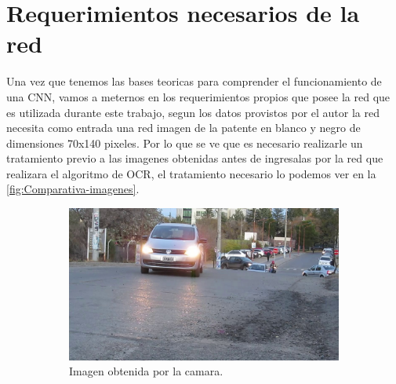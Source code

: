 \section{Requerimientos necesarios de la red}
Una vez que tenemos las bases teoricas para comprender el funcionamiento de una CNN, vamos a meternos en los requerimientos propios que posee 
la red que es utilizada durante este trabajo, segun los datos provistos por el autor la red necesita como entrada una red imagen de la patente
en blanco y negro de dimensiones 70x140 pixeles.
Por lo que se ve que es necesario realizarle un tratamiento previo a las imagenes obtenidas antes de ingresalas por la red que realizara el 
algoritmo de OCR, el tratamiento necesario lo podemos ver en la \ref{fig:Comparativa-imagenes}.
\begin{figure}[!tbp]
 \centering
    \begin{subfigure}[b]{0.49\textwidth}
        \includegraphics[width=\textwidth, height=\textwidth]{imgs/imagen-obtenida.jpg}
        \caption{Imagen obtenida por la camara.}
        \label{fig:imagen-obtenida}
    \end{subfigure}
    \hfill
    \begin{subfigure}[b]{0.49\textwidth}

\end{subfigure}
\end{figure}
